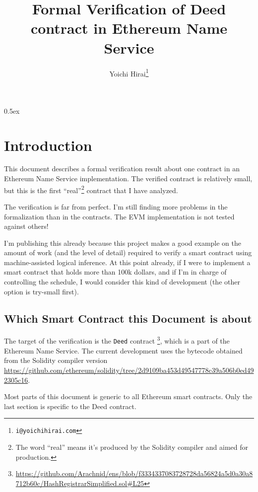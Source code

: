 \documentclass[11pt,a4paper]{article}
\begin{document}
\title{Formal Verification of Deed contract in Ethereum Name Service}
\author{Yoichi Hirai\footnote{\texttt{i@yoichihirai.com}}}
\maketitle

\tableofcontents

\parindent 0pt\parskip 0.5ex

\section{Introduction}

This document describes a formal verification result about one contract in
an Ethereum Name Service implementation.  The verified contract is relatively small,
but this is the first ``real''\footnote{The word ``real'' means it's
produced by the Solidity compiler and aimed for production.}
contract that I have analyzed.

The verification is far from perfect.
I'm still finding more problems in the
formalization than in the contracts.  The EVM implementation is not tested against
others!

I'm publishing this already because this project makes a
good example on the amount of work (and the level of detail) required to
verify a smart contract using machine-assisted logical inference.  At this
point already, if I were to
implement a smart contract that holds more than 100k dollars, and if
I'm in charge of controlling the schedule, I would consider this kind of
development (the other option is try-small first).

\subsection{Which Smart Contract this Document is about}

The target of the verification is the \texttt{Deed} contract%
\footnote{\url{https://github.com/Arachnid/ens/blob/f3334337083728728da56824a5d0a30a8712b60c/HashRegistrarSimplified.sol\#L25}},
which is a part of the Ethereum Name Service.
The current development uses the bytecode obtained from the
Solidity compiler version \url{https://github.com/ethereum/solidity/tree/2d9109ba453d49547778c39a506b0ed492305c16}.

Most parts of this document is generic to all Ethereum smart
contracts.  Only the last section is specific to the Deed contract.
\end{document}
